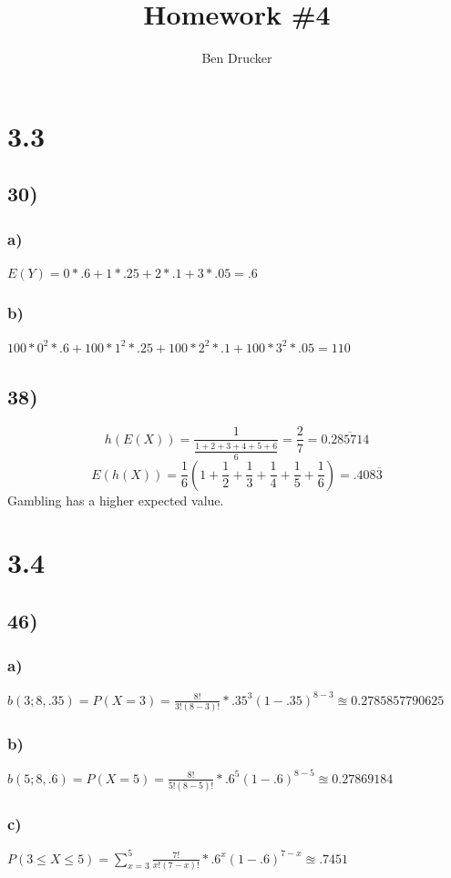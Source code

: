 \documentclass{article}
\newcommand{\hwkNum}{4}
\newcommand{\hwkAuthors}{Ben Drucker}
\begin{document}
\title{Homework \#\hwkNum}
\author{\hwkAuthors}
\date{}

\maketitle


\section*{3.3}
	\subsection*{30)}
		\subsubsection*{a)}
			$E(Y) = 0 * .6 + 1 * .25 + 2 * .1 + 3 * .05 = .6$
		\subsubsection*{b)}
			$ 100 *0^2 * .6 + 100*1^2 * .25 + 100*2^2 * .1 +100 *  3^2 * .05 = 110$
	\subsection*{38)}
		$$ h(E(X)) = \frac{1}{\frac{1+2+3+4+5+6}{6}} = \frac{2}{7} = 0.\overline{285714}$$
		$$E(h(X)) = \frac{1}{6} \left (1 + \frac{1}{2} + \frac{1}{3} + \frac{1}{4} + \frac{1}{5} + \frac{1}{6} \right ) = .408\overline{3}$$
		Gambling has a higher expected value. 
\section*{3.4}
	\subsection*{46)}
		\subsubsection*{a)}
			$ b(3; 8, .35) = P(X=3) = \frac{8!}{3!(8-3)!}*.35^3(1-.35)^{8-3} \approxeq 0.2785857790625$
		\subsubsection*{b)}
			$b(5; 8,.6) = P(X=5) = \frac{8!}{5!(8-5)!}*.6^5(1-.6)^{8-5} \approxeq 0.27869184$
		\subsubsection*{c)}
			$ P(3 \leq X \leq 5) = \sum_{x=3}^5 \frac{7!}{x!(7-x)!}*.6^x(1-.6)^{7-x} \approxeq .7451$	
\end{document}
